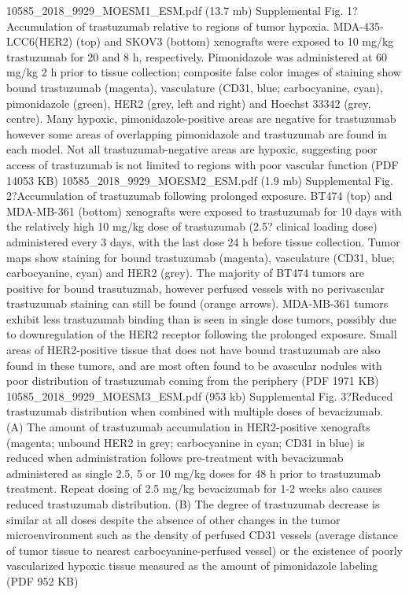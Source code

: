 10585_2018_9929_MOESM1_ESM.pdf (13.7 mb)
Supplemental Fig.
1?Accumulation of trastuzumab relative to regions of tumor hypoxia.
MDA-435-LCC6(HER2) (top) and SKOV3 (bottom) xenografts were exposed to 10 mg/kg trastuzumab for 20 and 8 h, respectively.
Pimonidazole was administered at 60 mg/kg 2 h prior to tissue collection; composite false color images of staining show bound trastuzumab (magenta), vasculature (CD31, blue; carbocyanine, cyan), pimonidazole (green), HER2 (grey, left and right) and Hoechst 33342 (grey, centre).
Many hypoxic, pimonidazole-positive areas are negative for trastuzumab however some areas of overlapping pimonidazole and trastuzumab are found in each model.
Not all trastuzumab-negative areas are hypoxic, suggesting poor access of trastuzumab is not limited to regions with poor vascular function (PDF 14053 KB)
10585_2018_9929_MOESM2_ESM.pdf (1.9 mb)
Supplemental Fig.
2?Accumulation of trastuzumab following prolonged exposure.
BT474 (top) and MDA-MB-361 (bottom) xenografts were exposed to trastuzumab for 10 days with the relatively high 10 mg/kg dose of trastuzumab (2.5? clinical loading dose) administered every 3 days, with the last dose 24 h before tissue collection.
Tumor maps show staining for bound trastuzumab (magenta), vasculature (CD31, blue; carbocyanine, cyan) and HER2 (grey).
The majority of BT474 tumors are positive for bound trasutuzmab, however perfused vessels with no perivascular trastuzumab staining can still be found (orange arrows).
MDA-MB-361 tumors exhibit less trastuzumab binding than is seen in single dose tumors, possibly due to downregulation of the HER2 receptor following the prolonged exposure.
Small areas of HER2-positive tissue that does not have bound trastuzumab are also found in these tumors, and are most often found to be avascular nodules with poor distribution of trastuzumab coming from the periphery (PDF 1971 KB)
10585_2018_9929_MOESM3_ESM.pdf (953 kb)
Supplemental Fig.
3?Reduced trastuzumab distribution when combined with multiple doses of bevacizumab.
(A) The amount of trastuzumab accumulation in HER2-positive xenografts (magenta; unbound HER2 in grey; carbocyanine in cyan; CD31 in blue) is reduced when administration follows pre-treatment with bevacizumab administered as single 2.5, 5 or 10 mg/kg doses for 48 h prior to trastuzumab treatment.
Repeat dosing of 2.5 mg/kg bevacizumab for 1-2 weeks also causes reduced trastuzumab distribution.
(B) The degree of trastuzumab decrease is similar at all doses despite the absence of other changes in the tumor microenvironment such as the density of perfused CD31 vessels (average distance of tumor tissue to nearest carbocyanine-perfused vessel) or the existence of poorly vascularized hypoxic tissue measured as the amount of pimonidazole labeling (PDF 952 KB)









\endinput

Any text after an \endinput is ignored.
You could put scraps here or things in progress.
